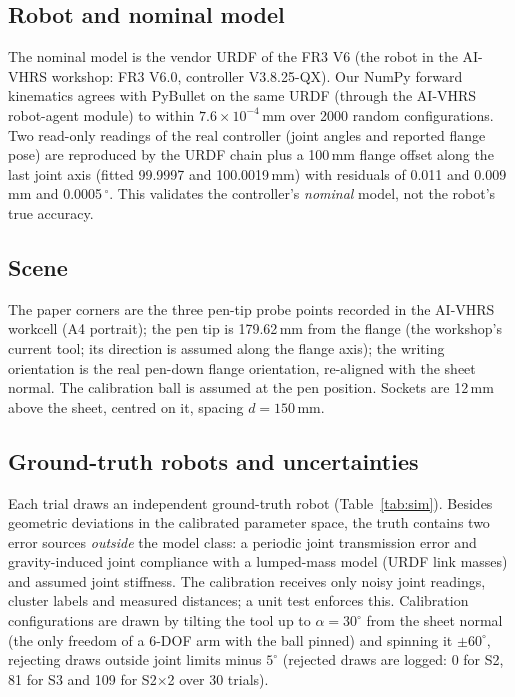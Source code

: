 \documentclass[conference]{IEEEtran}
\begin{document}
\subsection{Robot and nominal model}
The nominal model is the vendor URDF of the FR3 V6 \cite{frcoburdf} (the robot in the AI-VHRS workshop: FR3 V6.0,
controller V3.8.25-QX). Our NumPy forward kinematics agrees with PyBullet \cite{pybullet} on the same URDF (through the
AI-VHRS robot-agent module) to within $7.6\times10^{-4}$\,mm over 2000 random configurations. Two read-only readings
of the real controller (joint angles and reported flange pose) are reproduced by the URDF chain plus a 100\,mm flange
offset along the last joint axis (fitted 99.9997 and 100.0019\,mm) with residuals of 0.011 and 0.009\,mm and
0.0005\,$^\circ$. This validates the controller's \emph{nominal} model, not the robot's true accuracy.

\subsection{Scene}
The paper corners are the three pen-tip probe points recorded in the AI-VHRS workcell (A4 portrait); the pen tip is
179.62\,mm from the flange (the workshop's current tool; its direction is assumed along the flange axis); the writing
orientation is the real pen-down flange orientation, re-aligned with the sheet normal. The calibration ball is assumed at
the pen position. Sockets are 12\,mm above the sheet, centred on it, spacing $d=150$\,mm.

\subsection{Ground-truth robots and uncertainties}
Each trial draws an independent ground-truth robot (Table~\ref{tab:sim}). Besides geometric deviations in the calibrated
parameter space, the truth contains two error sources \emph{outside} the model class: a periodic joint transmission error and
gravity-induced joint compliance with a lumped-mass model (URDF link masses) and assumed joint stiffness. The calibration
receives only noisy joint readings, cluster labels and measured distances; a unit test enforces this. Calibration
configurations are drawn by tilting the tool up to $\alpha=30^\circ$ from the sheet normal (the only freedom of a 6-DOF arm
with the ball pinned) and spinning it $\pm60^\circ$, rejecting draws outside joint limits minus $5^\circ$ (rejected draws are
logged: 0 for S2, 81 for S3 and 109 for S2$\times$2 over 30 trials).
\end{document}
